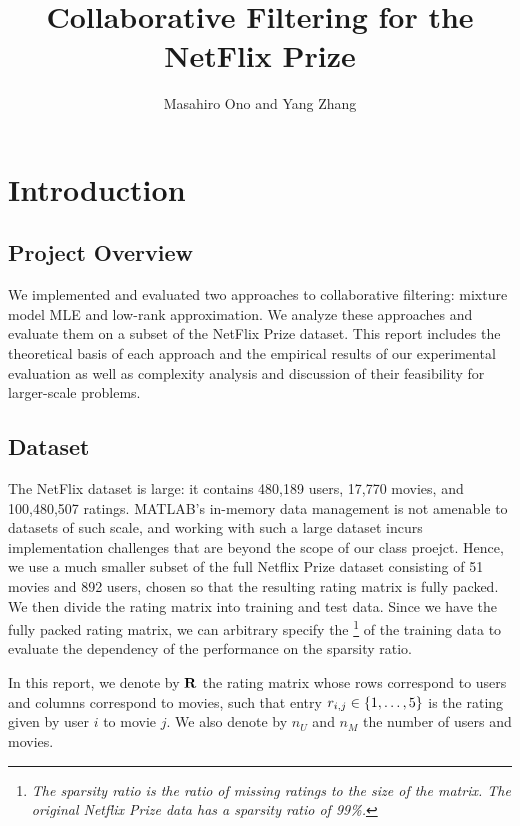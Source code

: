 \documentclass{article}
\title{Collaborative Filtering for the NetFlix Prize}
\author{Masahiro Ono and Yang Zhang}
\begin{document}
\maketitle

\tableofcontents

\section{Introduction}

\subsection{Project Overview}

We implemented and evaluated two approaches to collaborative
filtering: mixture model MLE and low-rank approximation. We analyze
these approaches and evaluate them on a subset of the NetFlix Prize
dataset. This report includes the theoretical basis of each approach
and the empirical results of our experimental evaluation as well as
complexity analysis and discussion of their feasibility for
larger-scale problems.


\subsection{Dataset}

The NetFlix dataset is large: it contains 480,189 users, 17,770
movies, and 100,480,507 ratings. MATLAB's in-memory data management is
not amenable to datasets of such scale, and working with such a large
dataset incurs implementation challenges that are beyond the scope of
our class proejct. Hence, we use a much smaller subset of the full
Netflix Prize dataset consisting of 51 movies and 892 users, chosen so
that the resulting rating matrix is fully packed. We then divide the
rating matrix into training and test data. Since we have the fully
packed rating matrix, we can arbitrary specify the \footnote{\textit{The sparsity ratio is the ratio of missing
    ratings to the size of the matrix. The original Netflix Prize data
    has a sparsity ratio of 99\%.}} of the training data to evaluate
the dependency of the performance on the sparsity ratio.

In this report, we denote by ${\bf R}$ the rating matrix whose rows
correspond to users and columns correspond to movies, such that entry
$r_{i,j} \in {\left\{ 1, \dots, 5 \right\}}$ is the rating given by user $i$ to movie
$j$. We also denote by $n_U$ and $n_M$ the number of users and movies.
\end{document}
